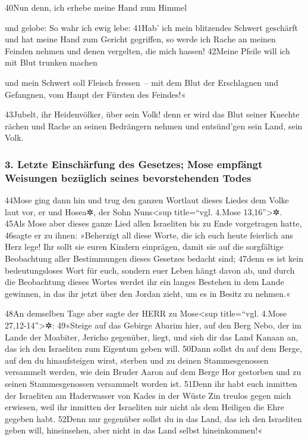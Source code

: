 40Nun denn, ich erhebe meine Hand zum Himmel

und gelobe: So wahr ich ewig lebe: 41Hab' ich mein blitzendes Schwert
geschärft und hat meine Hand zum Gericht gegriffen, so werde ich Rache
an meinen Feinden nehmen und denen vergelten, die mich hassen! 42Meine
Pfeile will ich mit Blut trunken machen

und mein Schwert soll Fleisch fressen~-- mit dem Blut der Erschlagnen
und Gefangnen, vom Haupt der Fürsten des Feindes!«

43Jubelt, ihr Heidenvölker, über sein Volk! denn er wird das Blut seiner
Knechte rächen und Rache an seinen Bedrängern nehmen und entsünd'gen
sein Land, sein Volk.

\hypertarget{letzte-einschuxe4rfung-des-gesetzes-mose-empfuxe4ngt-weisungen-bezuxfcglich-seines-bevorstehenden-todes}{%
\subsubsection{3. Letzte Einschärfung des Gesetzes; Mose empfängt
Weisungen bezüglich seines bevorstehenden
Todes}\label{letzte-einschuxe4rfung-des-gesetzes-mose-empfuxe4ngt-weisungen-bezuxfcglich-seines-bevorstehenden-todes}}

44Mose ging dann hin und trug den ganzen Wortlaut dieses Liedes dem
Volke laut vor, er und Hosea✲, der Sohn Nuns\textless sup title=``vgl.
4.Mose 13,16''\textgreater✲. 45Als Mose aber dieses ganze Lied allen
Israeliten bis zu Ende vorgetragen hatte, 46sagte er zu ihnen:
»Beherzigt all diese Worte, die ich euch heute feierlich ans Herz lege!
Ihr sollt sie euren Kindern einprägen, damit sie auf die sorgfältige
Beobachtung aller Bestimmungen dieses Gesetzes bedacht sind; 47denn es
ist kein bedeutungsloses Wort für euch, sondern euer Leben hängt davon
ab, und durch die Beobachtung dieses Wortes werdet ihr ein langes
Bestehen in dem Lande gewinnen, in das ihr jetzt über den Jordan zieht,
um es in Besitz zu nehmen.«

48An demselben Tage aber sagte der HERR zu Mose\textless sup
title=``vgl. 4.Mose 27,12-14''\textgreater✲: 49»Steige auf das Gebirge
Abarim hier, auf den Berg Nebo, der im Lande der Moabiter, Jericho
gegenüber, liegt, und sieh dir das Land Kanaan an, das ich den
Israeliten zum Eigentum geben will. 50Dann sollst du auf dem Berge, auf
den du hinaufsteigen wirst, sterben und zu deinen Stammesgenossen
versammelt werden, wie dein Bruder Aaron auf dem Berge Hor gestorben und
zu seinen Stammesgenossen versammelt worden ist. 51Denn ihr habt euch
inmitten der Israeliten am Haderwasser von Kades in der Wüste Zin
treulos gegen mich erwiesen, weil ihr inmitten der Israeliten mir nicht
als dem Heiligen die Ehre gegeben habt. 52Denn nur gegenüber sollst du
in das Land, das ich den Israeliten geben will, hineinsehen, aber nicht
in das Land selbst hineinkommen!«

